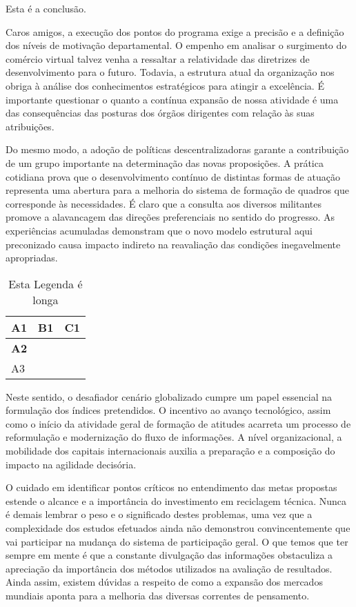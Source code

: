 Esta é a conclusão.

Caros amigos, a execução dos pontos do programa exige a precisão e a definição dos níveis de motivação departamental. O empenho em analisar o surgimento do comércio virtual talvez venha a ressaltar a relatividade das diretrizes de desenvolvimento para o futuro. Todavia, a estrutura atual da organização nos obriga à análise dos conhecimentos estratégicos para atingir a excelência. É importante questionar o quanto a contínua expansão de nossa atividade é uma das consequências das posturas dos órgãos dirigentes com relação às suas atribuições.

Do mesmo modo, a adoção de políticas descentralizadoras garante a contribuição de um grupo importante na determinação das novas proposições. A prática cotidiana prova que o desenvolvimento contínuo de distintas formas de atuação representa uma abertura para a melhoria do sistema de formação de quadros que corresponde às necessidades. É claro que a consulta aos diversos militantes promove a alavancagem das direções preferenciais no sentido do progresso. As experiências acumuladas demonstram que o novo modelo estrutural aqui preconizado causa impacto indireto na reavaliação das condições inegavelmente apropriadas.

\begin{table}[H]
	\centering
	\caption[Legenda Curta]{Esta Legenda é longa}
	\label{tab:tab1}
	\begin{tabular}{l|l|l}
		{\LARGE \textbf{A1}} & \textbf{B1} & \textbf{C1} \\ \hline
		\textbf{A2}          &             &             \\ \hline
		A3          &             &             \\
	\end{tabular}
\end{table}


Neste sentido, o desafiador cenário globalizado cumpre um papel essencial na formulação dos índices pretendidos. O incentivo ao avanço tecnológico, assim como o início da atividade geral de formação de atitudes acarreta um processo de reformulação e modernização do fluxo de informações. A nível organizacional, a mobilidade dos capitais internacionais auxilia a preparação e a composição do impacto na agilidade decisória.

O cuidado em identificar pontos críticos no entendimento das metas propostas estende o alcance e a importância do investimento em reciclagem técnica. Nunca é demais lembrar o peso e o significado destes problemas, uma vez que a complexidade dos estudos efetuados ainda não demonstrou convincentemente que vai participar na mudança do sistema de participação geral. O que temos que ter sempre em mente é que a constante divulgação das informações obstaculiza a apreciação da importância dos métodos utilizados na avaliação de resultados. Ainda assim, existem dúvidas a respeito de como a expansão dos mercados mundiais aponta para a melhoria das diversas correntes de pensamento.


